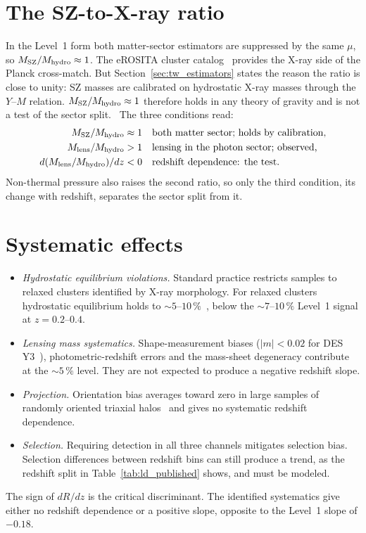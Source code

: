 \section{The SZ-to-X-ray ratio}\label{sec:tw_sz}
In the Level~1 form both matter-sector estimators are suppressed by the same $\mu$, so $M_{\rm SZ}/M_{\rm hydro}\approx1$. The eROSITA cluster
catalog~\cite{Bulbul2024} provides the X-ray side of the Planck cross-match. But Section~\ref{sec:tw_estimators} states the reason the ratio is close to
unity: SZ masses are calibrated on hydrostatic X-ray masses through the $Y$--$M$ relation. $M_{\rm SZ}/M_{\rm hydro}\approx1$ therefore holds in any
theory of gravity and is not a test of the sector split. \calibrated\ The three conditions read:
\begin{align}
M_{\rm SZ}/M_{\rm hydro}&\approx1&&\text{both matter sector; holds by calibration,}\label{eq:tw_test1}\\
M_{\rm lens}/M_{\rm hydro}&>1&&\text{lensing in the photon sector; observed,}\label{eq:tw_test2}\\
d(M_{\rm lens}/M_{\rm hydro})/dz&<0&&\text{redshift dependence: the test.}\label{eq:tw_test3}
\end{align}
Non-thermal pressure also raises the second ratio, so only the third condition, its change with redshift, separates the sector split from it.

\section{Systematic effects}\label{sec:tw_systematics}
\begin{itemize}
\item \emph{Hydrostatic equilibrium violations.} Standard practice restricts samples to relaxed clusters identified by X-ray morphology. For relaxed
clusters hydrostatic equilibrium holds to $\sim5$--$10\,\%$~\cite{Neto2007,Planelles2017}, below the $\sim7$--$10\,\%$ Level~1 signal at $z=0.2$--$0.4$.
\item \emph{Lensing mass systematics.} Shape-measurement biases ($|m|<0.02$ for DES Y3~\cite{MacCrann2022}), photometric-redshift errors and the
mass-sheet degeneracy contribute at the $\sim5\,\%$ level. They are not expected to produce a negative redshift slope.
\item \emph{Projection.} Orientation bias averages toward zero in large samples of randomly oriented triaxial halos~\cite{Corless2008} and gives no
systematic redshift dependence.
\item \emph{Selection.} Requiring detection in all three channels mitigates selection bias. Selection differences between redshift bins can still
produce a trend, as the redshift split in Table~\ref{tab:ld_published} shows, and must be modeled.
\end{itemize}
The sign of $dR/dz$ is the critical discriminant. The identified systematics give either no redshift dependence or a positive slope, opposite to the
Level~1 slope of $-0.18$. \interp

